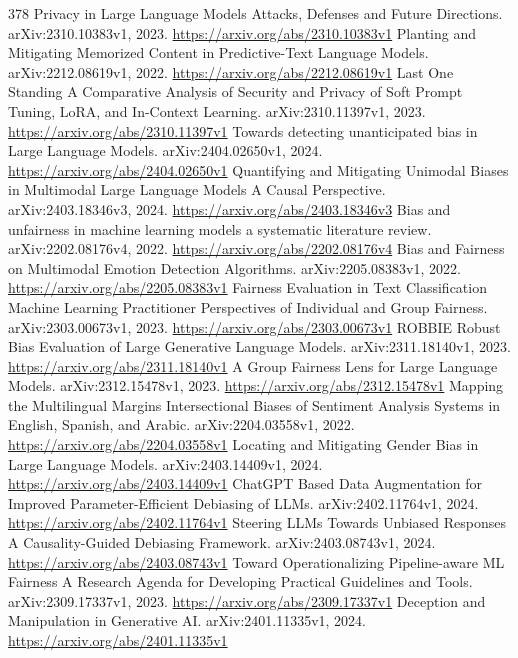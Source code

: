 \documentclass[11pt]{article}
\begin{document}
\begin{thebibliography}{378}
 Privacy in Large Language Models Attacks, Defenses and Future Directions. arXiv:2310.10383v1, 2023. \url{https://arxiv.org/abs/2310.10383v1}
 Planting and Mitigating Memorized Content in Predictive-Text Language Models. arXiv:2212.08619v1, 2022. \url{https://arxiv.org/abs/2212.08619v1}
 Last One Standing A Comparative Analysis of Security and Privacy of Soft Prompt Tuning, LoRA, and In-Context Learning. arXiv:2310.11397v1, 2023. \url{https://arxiv.org/abs/2310.11397v1}
 Towards detecting unanticipated bias in Large Language Models. arXiv:2404.02650v1, 2024. \url{https://arxiv.org/abs/2404.02650v1}
 Quantifying and Mitigating Unimodal Biases in Multimodal Large Language Models A Causal Perspective. arXiv:2403.18346v3, 2024. \url{https://arxiv.org/abs/2403.18346v3}
 Bias and unfairness in machine learning models a systematic literature review. arXiv:2202.08176v4, 2022. \url{https://arxiv.org/abs/2202.08176v4}
 Bias and Fairness on Multimodal Emotion Detection Algorithms. arXiv:2205.08383v1, 2022. \url{https://arxiv.org/abs/2205.08383v1}
 Fairness Evaluation in Text Classification Machine Learning Practitioner Perspectives of Individual and Group Fairness. arXiv:2303.00673v1, 2023. \url{https://arxiv.org/abs/2303.00673v1}
 ROBBIE Robust Bias Evaluation of Large Generative Language Models. arXiv:2311.18140v1, 2023. \url{https://arxiv.org/abs/2311.18140v1}
 A Group Fairness Lens for Large Language Models. arXiv:2312.15478v1, 2023. \url{https://arxiv.org/abs/2312.15478v1}
 Mapping the Multilingual Margins Intersectional Biases of Sentiment Analysis Systems in English, Spanish, and Arabic. arXiv:2204.03558v1, 2022. \url{https://arxiv.org/abs/2204.03558v1}
 Locating and Mitigating Gender Bias in Large Language Models. arXiv:2403.14409v1, 2024. \url{https://arxiv.org/abs/2403.14409v1}
 ChatGPT Based Data Augmentation for Improved Parameter-Efficient Debiasing of LLMs. arXiv:2402.11764v1, 2024. \url{https://arxiv.org/abs/2402.11764v1}
 Steering LLMs Towards Unbiased Responses A Causality-Guided Debiasing Framework. arXiv:2403.08743v1, 2024. \url{https://arxiv.org/abs/2403.08743v1}
 Toward Operationalizing Pipeline-aware ML Fairness A Research Agenda for Developing Practical Guidelines and Tools. arXiv:2309.17337v1, 2023. \url{https://arxiv.org/abs/2309.17337v1}
 Deception and Manipulation in Generative AI. arXiv:2401.11335v1, 2024. \url{https://arxiv.org/abs/2401.11335v1}

\end{thebibliography}
\end{document}
